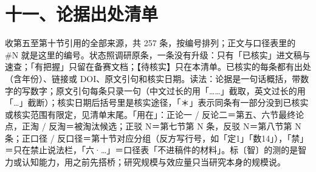 \documentclass[prep,both]{debate}
\begin{document}
\section{十一、论据出处清单}
收第五至第十节引用的全部来源，共 257 条，按编号排列；正文与口径表里的 \#N 就是这里的编号。状态照调研原条，一条没有升级：只有「已核实」进文稿与速查；「有把握」只留在备赛文档；【待核实】只在本清单。已核实的每条都有出处（含年份）、链接或 DOI、原文引句和核实日期。读法：论据是一句话概括，带数字的写数字；原文引句每条只录一句（中文过长的用「……」截取，英文过长的用「…」截断）；核实日期后括号里是核实途径，「＊」表示同条有一部分没到已核实或核实范围有限定，见清单末尾。「用在」：正论一 / 反论二＝第五、六节最终论点，正淘 / 反淘＝被淘汰候选；正驳 N＝第七节第 N 条，反驳 N＝第八节第 N 条；正口径 / 反口径＝第十节对应分组（反方写行号，如「定1」「数14」），「禁」＝只在禁止说法栏，「六·…」＝口径表「不进稿件的材料」。标〔智〕的测的是智力或认知能力，用之前先搭桥；研究规模与效应量只当研究本身的规模说。
\end{document}

